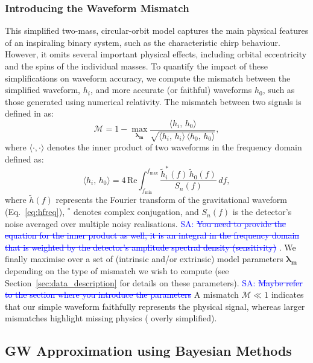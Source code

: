 \documentclass[10pt]{article}
\newcommand{\Sarp}[1]{{\textcolor{blue}{{SA: #1}} }}
\begin{document}
\subsubsection{Introducing the Waveform Mismatch}
\label{subsec:mismatch_intro}
%
%
This simplified two-mass, circular-orbit model captures the main physical features of an inspiraling binary system, such as the characteristic chirp behaviour.
However, it omits several important physical effects, including orbital eccentricity and the spins of the individual masses. 
To quantify the impact of these simplifications on waveform accuracy, we compute the mismatch between the simplified waveform, 
\( h_i \), and more accurate (or faithful) waveforms \( h_0 \), such as those generated using numerical relativity.
The mismatch between two signals is defined in \cite{mismatch, Ogpaper} as:
%
\begin{equation}
\label{eq:mismatch_def}
\mathcal{M} = 1 - \max_{\boldsymbol{\lambda_m}}
\frac{\langle h_i,\,h_0 \rangle}{\sqrt{\langle h_i,\,h_i \rangle \,\langle h_0,\,h_0 \rangle}},
\end{equation}
%
where \( \langle \cdot, \cdot \rangle \) denotes the inner product of two waveforms in the frequency domain defined as:
%
\begin{equation}
\langle h_i,\,h_0 \rangle = 4\,\mathrm{Re} \int_{f_{\text{min}}}^{f_{\text{max}}} \frac{\tilde{h}_i^*(f)\,\tilde{h}_0(f)}{S_n(f)}\,df,
\end{equation}
%
where \( \tilde{h}(f) \) represents the Fourier transform of the gravitational waveform (Eq.~\eqref{eq:hfreq}), \( ^* \) denotes complex conjugation, and \( S_n(f) \) is the detector’s noise averaged over multiple noisy realisations.
\Sarp{\sout{You need to provide the equation for the inner product as well, it is an integral in the frequency domain that
is weighted by the detector's amplitude spectral density (sensitivity)}}.
We finally maximise over a set of (intrinsic and/or extrinsic) model parameters \(\mathbf{\lambda_m}\) depending on the type of mismatch we wish to compute
 (see Section~\ref{sec:data_description} for details on these parameters).
\Sarp{\sout{Maybe refer to the section where you introduce the parameters}}
A mismatch \(\mathcal{M}\ll 1\) indicates that our simple waveform
faithfully represents the physical signal, whereas larger mismatches highlight missing
physics ( overly simplified).




\subsection{GW Approximation using Bayesian Methods}
\label{sec:GW_and_Bayes}
\end{document}
